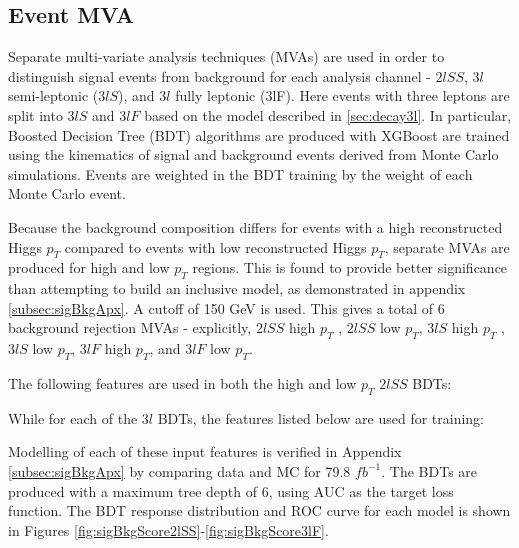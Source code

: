 
\subsection{Event MVA}
\label{subsec:sigBkgMVA}

Separate multi-variate analysis techniques (MVAs) are used in order to distinguish signal events from background for each analysis channel - $2lSS$, $3l$ semi-leptonic ($3lS$), and $3l$ fully leptonic (3lF). Here events with three leptons are split into $3lS$ and $3lF$ based on the model described in \ref{sec:decay3l}. In particular, Boosted Decision Tree (BDT) algorithms are produced with XGBoost \cite{xgboost_cite} are trained using the kinematics of signal and background events derived from Monte Carlo simulations. Events are weighted in the BDT training by the weight of each Monte Carlo event. 

Because the background composition differs for events with a high reconstructed Higgs $p_T$ compared to events with low reconstructed Higgs $p_T$, separate MVAs are produced for high and low $p_T$ regions. This is found to provide better significance than attempting to build an inclusive model, as demonstrated in appendix \ref{subsec:sigBkgApx}. A cutoff of 150 GeV is used. This gives a total of 6 background rejection MVAs - explicitly, $2lSS$ high $p_T$ , $2lSS$ low $p_T$, $3lS$ high $p_T$ , $3lS$ low $p_T$, $3lF$ high $p_T$, and $3lF$ low $p_T$.

The following features are used in both the high and low $p_T$ $2lSS$ BDTs:

\begin{table}[H]

\end{table}

While for each of the $3l$ BDTs, the features listed below are used for training:

\begin{table}[H]

\end{table}

Modelling of each of these input features is verified in Appendix \ref{subsec:sigBkgApx} by comparing data and MC for 79.8 $fb^{-1}$. The BDTs are produced with a maximum tree depth of 6, using AUC as the target loss function. The BDT response distribution and ROC curve for each model is shown in Figures \ref{fig:sigBkgScore2lSS}-\ref{fig:sigBkgScore3lF}.

